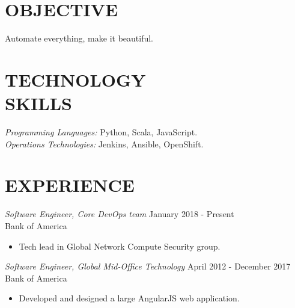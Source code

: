 \documentclass[margin, 10pt]{res} %
\begin{document}
    \begin{resume}


        \section{OBJECTIVE}

        Automate everything, make it beautiful.


        \section{TECHNOLOGY \\ SKILLS}

        {\sl Programming Languages:} Python, Scala, JavaScript. \\
        {\sl Operations Technologies:} Jenkins, Ansible, OpenShift. \\


        \section{EXPERIENCE}

        {\sl Software Engineer, Core DevOps team} \hfill January 2018 - Present \\
        Bank of America
        \begin{itemize}
            \item Tech lead in Global Network Compute Security group.
        \end{itemize}

        {\sl Software Engineer, Global Mid-Office Technology} \hfill April 2012 - December 2017 \\
        Bank of America
        \begin{itemize}
            \item Developed and designed a large AngularJS web application.
        \end{itemize}


\end{resume}
\end{document}
